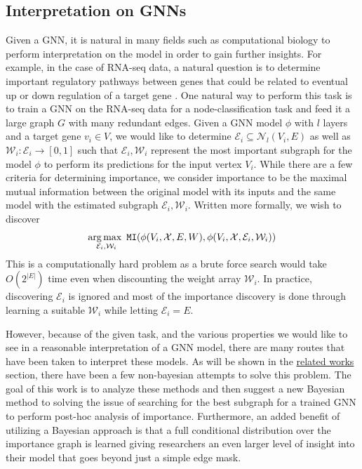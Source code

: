\subsection{Interpretation on GNNs}
Given a GNN, it is natural in many fields such as computational biology to perform interpretation on the model in order to gain further insights. For example, in the case of RNA-seq data, a natural question is to determine important regulatory pathways between genes that could be related to eventual up or down regulation of a target gene \cite{petralia_new_2016}. One natural way to perform this task is to train a GNN on the RNA-seq data for a node-classification task and feed it a large graph $G$ with many redundant edges. Given a GNN model $\phi$ with $l$ layers and a target gene $v_{i} \in V$, we would like to determine $\mathcal{E}_{i} \subseteq \mathcal{N}_{l}(V_{i}, E)$ as well as $\mathcal{W}_{i} : \mathcal{E}_{i} \rightarrow [0,1]$ such that $\mathcal{E}_{i}, \mathcal{W}_{i}$ represent the most important subgraph for the model $\phi$ to perform its predictions for the input vertex $V_{i}$. While there are a few criteria for determining importance, we consider importance to be the maximal mutual information between the original model with its inputs and the same model with the estimated subgraph $\mathcal{E}_{i}, \mathcal{W}_{i}$. Written more formally, we wish to discover
\begin{align*}
  \operatorname*{arg\,max\,\,}_{\mathcal{E}_{i}, \mathcal{W}_{i}} \mathtt{MI}(\phi(V_{i}, \mathcal{X}, E, W), \phi(V_{i}, \mathcal{X}, \mathcal{E}_{i}, \mathcal{W}_{i}))
\end{align*}
This is a computationally hard problem as a brute force search would take $O(2^{|E|})$ time even when discounting the weight array $\mathcal{W}_{i}$. In practice, discovering $\mathcal{E}_i$ is ignored and most of the importance discovery is done through learning a suitable $\mathcal{W}_i$ while letting $\mathcal{E}_i = E$.

However, because of the given task, and the various properties we would like to see in a reasonable interpretation of a GNN model, there are many routes that have been taken to interpret these models. As will be shown in the \hyperref[sec:related]{related works} section, there have been a few non-bayesian attempts to solve this problem. The goal of this work is to analyze these methods and then suggest a new Bayesian method to solving the issue of searching for the best subgraph for a trained GNN to perform post-hoc analysis of importance. Furthermore, an added benefit of utilizing a Bayesian approach is that a full conditional distribution over the importance graph is learned giving researchers an even larger level of insight into their model that goes beyond just a simple edge mask.

